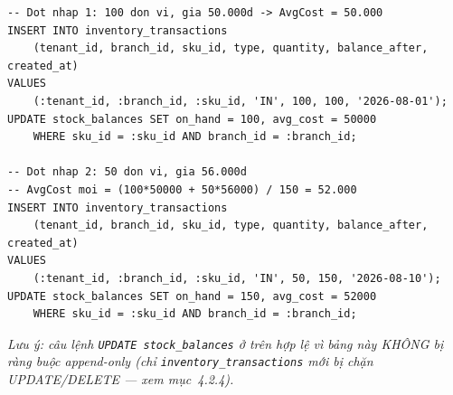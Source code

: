 \begin{lstlisting}
-- Dot nhap 1: 100 don vi, gia 50.000d -> AvgCost = 50.000
INSERT INTO inventory_transactions
    (tenant_id, branch_id, sku_id, type, quantity, balance_after, created_at)
VALUES
    (:tenant_id, :branch_id, :sku_id, 'IN', 100, 100, '2026-08-01');
UPDATE stock_balances SET on_hand = 100, avg_cost = 50000
    WHERE sku_id = :sku_id AND branch_id = :branch_id;

-- Dot nhap 2: 50 don vi, gia 56.000d
-- AvgCost moi = (100*50000 + 50*56000) / 150 = 52.000
INSERT INTO inventory_transactions
    (tenant_id, branch_id, sku_id, type, quantity, balance_after, created_at)
VALUES
    (:tenant_id, :branch_id, :sku_id, 'IN', 50, 150, '2026-08-10');
UPDATE stock_balances SET on_hand = 150, avg_cost = 52000
    WHERE sku_id = :sku_id AND branch_id = :branch_id;
\end{lstlisting}

\textit{Lưu ý: câu lệnh \texttt{UPDATE stock\_balances} ở trên hợp lệ vì bảng này KHÔNG bị ràng buộc append-only (chỉ \texttt{inventory\_transactions} mới bị chặn UPDATE/DELETE — xem mục~4.2.4).}
